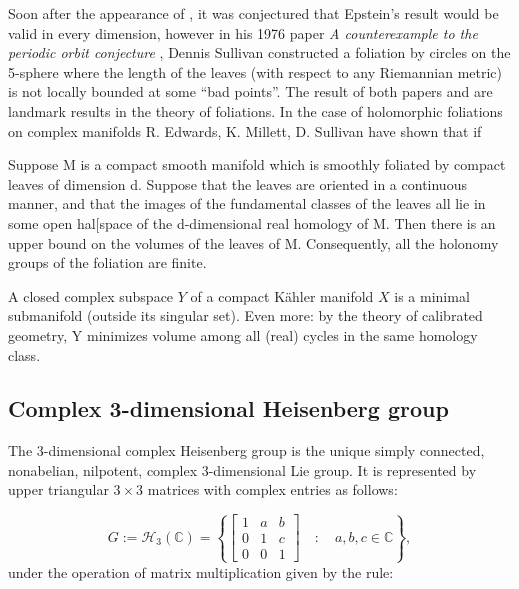 \documentclass[12pt,twoside,a4paper]{report}
\newcommand{\co}{\ensuremath{\mathbb C }}
\begin{document}
Soon after the appearance of \cite{Ep2}, it was conjectured that  Epstein's result would be valid in every dimension, however
in his 1976 paper {\em A counterexample to the periodic orbit conjecture} \cite{Su},
Dennis Sullivan constructed a foliation by circles on the 5-sphere where the length of the leaves (with respect to any Riemannian metric)  is not locally bounded at some ``bad points''.  The result of both papers \cite{Ep2} and \cite{Su} are landmark results in the theory of foliations. 
In the case of holomorphic foliations on complex manifolds R. Edwards, K. Millett, D. Sullivan \cite{EMS}
have shown that if

Suppose M is a compact smooth manifold which is smoothly foliated by compact leaves of dimension d. Suppose that the leaves are oriented in a continuous manner, and that the images of the fundamental classes of the leaves all lie in some open hal[space of the d-dimensional real homology of M. Then there is an upper bound on the volumes of the leaves of M. Consequently, all the holonomy groups of the foliation are finite.


A closed complex subspace $Y$ of a compact Kähler manifold $X$ is a minimal submanifold (outside its singular set).  Even more: by the theory of calibrated geometry, Y minimizes volume among all (real) cycles in the same homology class. 

\subsection{Complex 3-dimensional Heisenberg group} The 3-dimensional complex Heisenberg group is the unique simply connected, nonabelian, nilpotent, complex 3-dimensional Lie group. It is represented by upper triangular  $3\times3$ matrices with complex entries as follows:



\begin{equation}
G:=\mathcal{H}_3(\co)=\left\{\begin{bmatrix}
1 & a &  b\\
0 & 1 & c\\
0 & 0 & 1\end{bmatrix}\quad : \quad a,b,c \in\co\right\},
\end{equation}
under the operation of matrix multiplication given by the rule:
 
\end{document}
